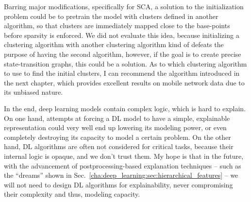 		Barring major modifications, specifically for \ac{SCA}, a solution to the initialization problem could be to pretrain the model with clusters defined in another algorithm, so that clusters are immediately mapped close to the base-points before sparsity is enforced.
		We did not evaluate this idea, because initializing a clustering algorithm with another clustering algorithm kind of defeats the purpose of having the second algorithm, however, if the goal is to create precise state-transition graphs, this could be a solution.
		As to which clustering algorithm to use to find the initial clusters, I can recommend the algorithm introduced in the next chapter, which provides excellent results on mobile network data due to its unbiased nature.
		
		In the end, deep learning models contain complex logic, which is hard to explain.
		On one hand, attempts at forcing a \ac{DL} model to have a simple, explainable representation could very well end up lowering its modeling power, or even completely destroying its capacity to model a certain problem.
		On the other hand, \ac{DL} algorithms are often not considered for critical tasks, because their internal logic is opaque, and we don't trust them.
		My hope is that in the future, with the advancement of postprocessing-based explanation techniques -- such as the ``dreams'' shown in Sec.~\ref{cha:deep_learning:sec:hierarchical_features} --  we will not need to design \ac{DL} algorithms for explainability, never compromising their complexity and thus, modeling capacity.
